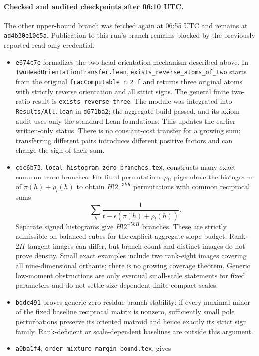\documentclass[11pt]{article}
\begin{document}
\paragraph{Checked and audited checkpoints after 06:10 UTC.}
The other upper-bound branch was fetched again at 06:55 UTC and remains
at \texttt{ad4b30e10e5a}. Publication to this run's branch remains
blocked by the previously reported read-only credential.
\begin{itemize}
\item \texttt{e674c7e} formalizes the two-head orientation mechanism
described above. In \texttt{TwoHeadOrientationTransfer.lean},
\texttt{exists\_reverse\_atoms\_of\_two} starts from the original
\texttt{fracComputable n 2 f} and returns three original atoms with
strictly reverse orientation and all strict signs. The general finite
two-ratio result is \texttt{exists\_reverse\_three}. The module was
integrated into \texttt{Results/All.lean} in \texttt{d671ba2}; the
aggregate build passed, and its axiom audit uses only the standard
Lean foundations. This updates the earlier written-only status.
There is no constant-cost transfer for a growing sum: transferring
different pairs introduces different positive factors and can change
the sign of their sum.
\item \texttt{cdc6b73}, \texttt{local-histogram-zero-branches.tex},
constructs many exact common-score branches. For fixed permutations
$\rho_l$, pigeonhole the histograms of $\pi(h)+\rho_l(h)$ to obtain
$H!2^{-3kH}$ permutations with common reciprocal sums
\[
 \sum_h\frac1{t-\epsilon(\pi(h)+\rho_l(h))}.
\]
Separate signed histograms give $H!2^{-5kH}$ branches. These are
strictly admissible on balanced cubes for the explicit aggregate
slope budget. Rank-$2H$ tangent images can differ, but branch count
and distinct images do not prove density. Small exact examples
include two rank-eight images covering all nine-dimensional orthants;
there is no growing coverage theorem. Generic low-moment obstructions
are only eventual small-scale statements for fixed parameters and
do not settle size-dependent finite compact scales.
\item \texttt{bddc491} proves generic zero-residue branch stability:
if every maximal minor of the fixed baseline reciprocal matrix is
nonzero, sufficiently small pole perturbations preserve its oriented
matroid and hence exactly its strict sign family. Rank-deficient or
scale-dependent baselines are outside this argument.
\item \texttt{a0ba1f4}, \texttt{order-mixture-margin-bound.tex}, gives

\end{itemize}
\end{document}
